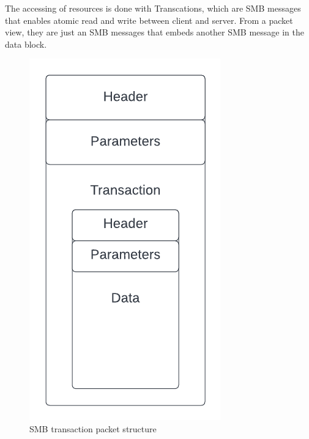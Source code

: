 The accessing of resources is done with Transcations, which are SMB messages that enables atomic read and write
between client and server.
From a packet view, they are just an SMB messages that embeds another SMB message in the data block.
\begin{figure}[ht!]
    \centering
      \includegraphics[scale=0.4]{images/smb_trans_structure.png}
      \caption{SMB transaction packet structure}
\end{figure}

